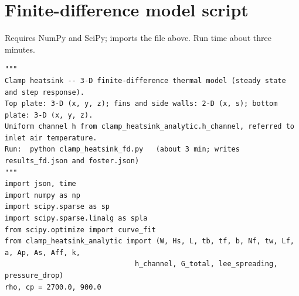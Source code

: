 \documentclass[11pt,a4paper]{article}
\begin{document}
\section{Finite-difference model script}\label{app:fd}
Requires NumPy and SciPy; imports the file above. Run time about three minutes.
\begin{lstlisting}
"""
Clamp heatsink -- 3-D finite-difference thermal model (steady state and step response).
Top plate: 3-D (x, y, z); fins and side walls: 2-D (x, s); bottom plate: 3-D (x, y, z).
Uniform channel h from clamp_heatsink_analytic.h_channel, referred to inlet air temperature.
Run:  python clamp_heatsink_fd.py   (about 3 min; writes results_fd.json and foster.json)
"""
import json, time
import numpy as np
import scipy.sparse as sp
import scipy.sparse.linalg as spla
from scipy.optimize import curve_fit
from clamp_heatsink_analytic import (W, Hs, L, tb, tf, b, Nf, tw, Lf, a, Ap, As, Aff, k,
                               h_channel, G_total, lee_spreading, pressure_drop)
rho, cp = 2700.0, 900.0


\end{lstlisting}
\end{document}
